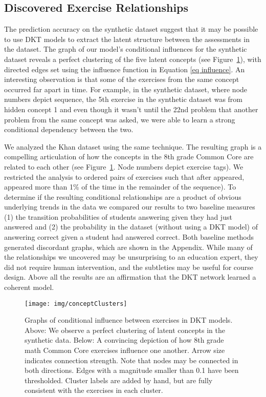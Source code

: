 \documentclass{article} \usepackage{nips,times}
\begin{document}
\subsection{Discovered Exercise Relationships}\label{sec ex rel}

The prediction accuracy on the synthetic dataset suggest that it may be possible to use DKT models to extract the latent structure between the assessments in the dataset. The graph of our model's conditional influences for the synthetic dataset reveals a perfect clustering of the five latent concepts (see Figure~\ref{fig:conceptClusters}),
with directed edges set using the influence function in Equation \ref{eq influence}.
An interesting observation is that some of the exercises from the same concept occurred far apart in time. For example, in the synthetic dataset, where node numbers depict sequence, the 5th exercise in the synthetic dataset was from hidden concept 1 and even though it wasn't until the 22nd problem that another problem from the same concept was asked, we were able to learn a strong conditional dependency between the two.

We analyzed the Khan dataset using the same technique. The resulting graph is a compelling articulation of how the concepts in the 8th grade Common Core are related to each other (see Figure~\ref{fig:conceptClusters}. Node numbers depict exercise tags).
We restricted the analysis to ordered pairs of exercises  such that after  appeared,  appeared more than 1\% of the time in the remainder of the sequence).
To determine if the resulting conditional relationships are a product of obvious underlying trends in the data we compared our results to two baseline measures (1) the transition probabilities of students answering  given they had just answered  and (2) the probability in the dataset (without using a DKT model) of answering  correct given a student had answered  correct.
Both baseline methods generated discordant graphs, which are shown in the Appendix. While many of the relationships we uncovered may be unsurprising to an education expert, they did not require human intervention, and the subtleties may be useful for course design. Above all the results are an affirmation that the DKT network learned a coherent model.


\begin{figure}[t]
\centering
\texttt{[image: img/conceptClusters]}
\caption{Graphs of conditional influence between exercises in  DKT models. Above: We observe a perfect clustering of latent concepts in the synthetic data. Below: A convincing depiction of how 8th grade math Common Core exercises influence one another.
Arrow size indicates connection strength. Note that nodes may be connected in both directions. Edges with a magnitude smaller than 0.1 have been thresholded. Cluster labels are added by hand, but are fully consistent with the exercises in each cluster.
\label{fig:conceptClusters}
}
\vspace{-3mm}
\end{figure}
\end{document}
